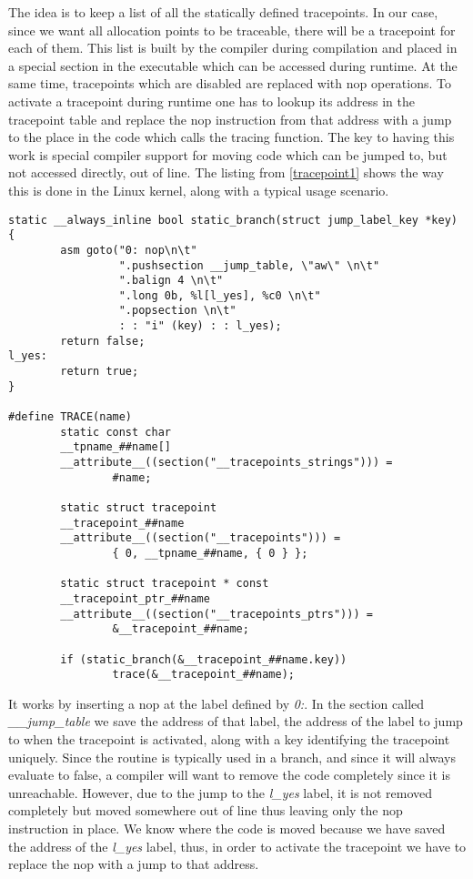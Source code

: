 The idea is to keep a list of all the statically defined tracepoints. In our case, since we want all allocation points to be traceable, there will be a tracepoint for each of them. This list is built by the compiler during compilation and placed in a special section in the executable which can be accessed during runtime. At the same time, tracepoints which are disabled are replaced with nop operations. To activate a tracepoint during runtime one has to lookup its address in the tracepoint table and replace the nop instruction from that address with a jump to the place in the code which calls the tracing function. The key to having this work is special compiler support for moving code which can be jumped to, but not accessed directly, out of line\cite{GCCasmgoto}. The listing from \ref{tracepoint1} shows the way this is done in the Linux kernel, along with a typical usage scenario.
\begin{lstlisting}[label=tracepoint1,caption=Linux kernel jump label implementation]
static __always_inline bool static_branch(struct jump_label_key *key)
{
        asm goto("0: nop\n\t"
                 ".pushsection __jump_table, \"aw\" \n\t"
                 ".balign 4 \n\t"
                 ".long 0b, %l[l_yes], %c0 \n\t"
                 ".popsection \n\t"
                 : : "i" (key) : : l_yes);
        return false;
l_yes:
        return true;
}

#define TRACE(name)
        static const char
        __tpname_##name[]
        __attribute__((section("__tracepoints_strings"))) =
                #name;

        static struct tracepoint
        __tracepoint_##name
        __attribute__((section("__tracepoints"))) =
                { 0, __tpname_##name, { 0 } };

        static struct tracepoint * const
        __tracepoint_ptr_##name
        __attribute__((section("__tracepoints_ptrs"))) =
                &__tracepoint_##name;

        if (static_branch(&__tracepoint_##name.key))
                trace(&__tracepoint_##name);
\end{lstlisting}

It works by inserting a nop at the label defined by \textit{0:}. In the section called \textit{\_\_jump\_table} we save the address of that label, the address of the label to jump to when the tracepoint is activated, along with a key identifying the tracepoint uniquely. Since the routine is typically used in a branch, and since it will always evaluate to false, a compiler will want to remove the code completely since it is unreachable. However, due to the jump to the \textit{l\_yes} label, it is not removed completely but moved somewhere out of line thus leaving only the nop instruction in place. We know where the code is moved because we have saved the address of the \textit{l\_yes} label, thus, in order to activate the tracepoint we have to replace the nop with a jump to that address.

